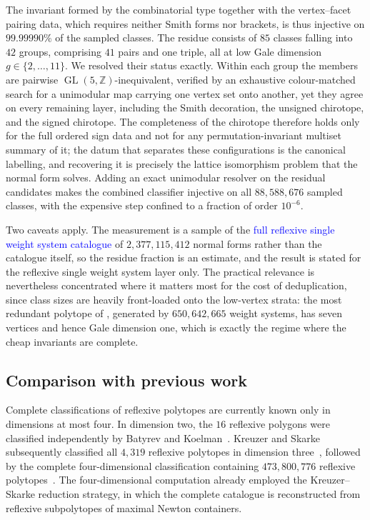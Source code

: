 \documentclass[appliedmath,article,submit,moreauthors]{Definitions/mdpi}
\newcommand{\Z}{\mathbb{Z}}
\newcommand{\GL}{\operatorname{GL}}
\begin{document}
The invariant formed by the combinatorial type together with the vertex--facet
pairing data, which requires neither Smith forms nor brackets, is thus injective
on \(99.99990\%\) of the sampled classes. The residue consists of \(85\) classes
falling into \(42\) groups, comprising \(41\) pairs and one triple, all at low
Gale dimension \(g\in\{2,\dots,11\}\). We resolved their status exactly. Within
each group the members are pairwise \(\GL(5,\Z)\)-inequivalent, verified by an
exhaustive colour-matched search for a unimodular map carrying one vertex set
onto another, yet they agree on every remaining layer, including the Smith
decoration, the unsigned chirotope, and the signed chirotope. The completeness
of the chirotope therefore holds only for the full ordered sign data and not for
any permutation-invariant multiset summary of it; the datum that separates these
configurations is the canonical labelling, and recovering it is precisely the
lattice isomorphism problem that the normal form solves. Adding an exact
unimodular resolver on the residual candidates makes the combined classifier
injective on all \(88{,}588{,}676\) sampled classes, with the expensive step
confined to a fraction of order \(10^{-6}\).

Two caveats apply. The measurement is a sample of the \textcolor{blue}{full
reflexive single weight system catalogue} of
\(2{,}377{,}115{,}412\) normal forms rather than the catalogue itself, so the
residue fraction is an estimate, and the result is stated for the reflexive
single weight system layer only. The practical relevance is nevertheless
concentrated where it matters most for the cost of deduplication, since class
sizes are heavily front-loaded onto the low-vertex strata: the most redundant
polytope of , generated by \(650{,}642{,}665\) weight
systems, has seven vertices and hence Gale dimension one, which is exactly the
regime where the cheap invariants are complete.

\subsection{Comparison with previous work}
\label{sec:comparison}

Complete classifications of reflexive polytopes are currently known only in
dimensions at most four. In dimension two, the \(16\) reflexive polygons were
classified independently by Batyrev and Koelman~\cite{Batyrev1985,Koelman1991}.
Kreuzer and Skarke subsequently classified all \(4{,}319\) reflexive polytopes
in dimension three~\cite{KreuzerSkarke1998}, followed by the complete
four-dimensional classification containing \(473{,}800{,}776\) reflexive
polytopes~\cite{KreuzerSkarke2000}. The four-dimensional computation already
employed the Kreuzer--Skarke reduction strategy, in which the complete catalogue
is reconstructed from reflexive subpolytopes of maximal Newton containers.
\end{document}
